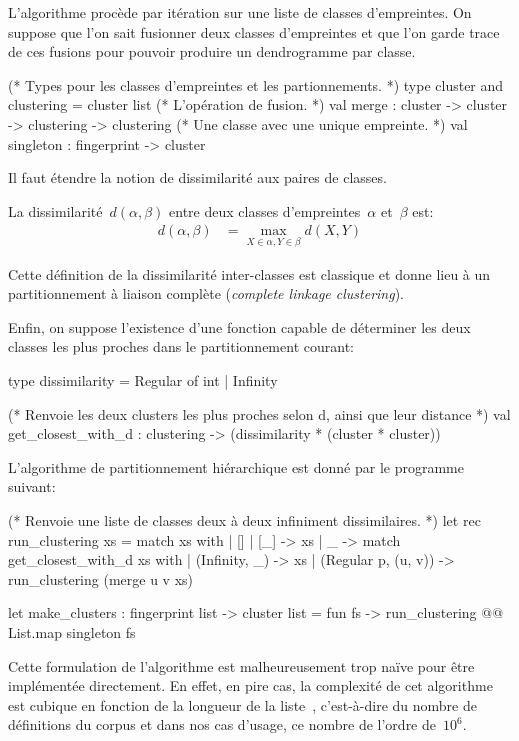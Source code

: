 L'algorithme procède par itération sur une liste de classes
d'empreintes. On suppose que l'on sait fusionner deux classes
d'empreintes et que l'on garde trace de ces fusions pour pouvoir
produire un dendrogramme par classe.

\begin{ocaml}
(* Types pour les classes d'empreintes et les partionnements. *)
type cluster and clustering = cluster list
(* L'opération de fusion. *)
val merge : cluster -> cluster -> clustering -> clustering
(* Une classe avec une unique empreinte. *)
val singleton : fingerprint -> cluster
\end{ocaml}

Il faut étendre la notion de dissimilarité aux paires de classes.

\begin{defn}
La dissimilarité~$d(\alpha, \beta)$ entre deux classes
d'empreintes~$\alpha$ et~$\beta$ est:
\begin{align*}
d(\alpha,\beta) &= \max\limits_{X \in \alpha, Y \in \beta} d(X,Y)
\end{align*}
\end{defn}

Cette définition de la dissimilarité inter-classes est classique et
donne lieu à un partitionnement à liaison complète (\emph{complete
  linkage clustering}).

Enfin, on suppose l'existence d'une fonction capable de déterminer
les deux classes les plus proches dans le partitionnement courant:

\begin{ocaml}
type dissimilarity = Regular of int | Infinity

(* Renvoie les deux clusters les plus proches selon d, ainsi que leur distance *)
val get_closest_with_d : clustering -> (dissimilarity * (cluster * cluster))
\end{ocaml}

L'algorithme de partitionnement hiérarchique est donné par le programme {\OCaml} suivant:

\begin{ocaml}
(* Renvoie une liste de classes deux à deux infiniment dissimilaires. *)
let rec run_clustering xs =
  match xs with
  | [] | [_] -> xs
  | _ -> match get_closest_with_d xs with
         | (Infinity, _) -> xs
         | (Regular p, (u, v)) -> run_clustering (merge u v xs)

let make_clusters : fingerprint list -> cluster list = fun fs ->
  run_clustering @@ List.map singleton fs
\end{ocaml}

Cette formulation de l'algorithme est malheureusement trop naïve pour
être implémentée directement. En effet, en pire cas, la complexité de
cet algorithme est cubique en fonction de la longueur de la
liste~, c'est-à-dire du nombre de définitions du
corpus et dans nos cas d'usage, ce nombre de l'ordre de~$10^6$.

